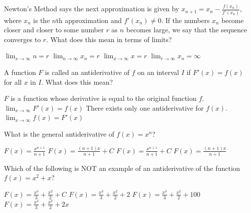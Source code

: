 \documentclass[addpoints, 12pt]{exam}%
\newcommand{\spc}{\vspace*{0.5cm}}
\begin{document}
\begin{questions}
\question[1]

Newton's Method says the next approximation is given by $x_{n+1} = x_n - \frac{f(x_n)}{f'(x_n)}$, where $x_n$ is the $n$th approximation and $f'(x_n) \neq 0$. 
If the numbers $x_n$ become closer and closer to some number $r$ as $n$ becomes large, we say that the sequence converges to $r$. What does this mean in terms of limits?

\begin{multicols}{2}
\begin{choices}
\choice $\lim_{x \to \infty} n = r$
\CorrectChoice $\lim_{n \to \infty} x_n = r$ 
\choice $\lim_{x \to \infty} x = r$
\choice $\lim_{r \to \infty} x_n = \infty$
\end{choices}  
\end{multicols}


\question[1]

A function $F$ is called an antiderivative of $f$ on an interval $I$ if $F'(x) = f(x)$ for all $x$ in $I$. What does this mean?

\begin{multicols}{2}
\begin{choices}
\CorrectChoice $F$ is a function whose derivative is equal to the original function $f$.
\choice $\lim_{x \to \infty} F'(x) = f(x)$
\choice There exists only one antiderivative for $f(x)$.
\choice $\lim_{x \to \infty} f(x) = F'(x)$
\end{choices}  
\end{multicols}

\newpage

\question[1]

What is the general antiderivative of $f(x) = x^n$?

\begin{multicols}{2}
\begin{choices}
\choice $F(x) = \frac{x^{n+1}}{n+1}$
\choice $F(x) = \frac{(n+1)x}{n+1} + C$
\CorrectChoice $F(x) = \frac{x^{n+1}}{n+1} + C$
\choice $F(x) = \frac{(n+1)x}{n+1}$
\end{choices} 
\end{multicols}

\spc

\question[1]

Which of the following is NOT an example of an antiderivative of  the function $f(x) = x^2 + x$?

\begin{multicols}{2}
\begin{choices}
\choice $F(x) = \frac{x^3}{3} + \frac{x^2}{2} + C$
\choice $F(x) = \frac{x^3}{3} + \frac{x^2}{2} + 2$
\choice $F(x) = \frac{x^3}{3} + \frac{x^2}{2} + 100$
\CorrectChoice $F(x) = \frac{x^3}{3} + \frac{x^2}{2} + 2x$
\end{choices}
\end{multicols}


\end{questions}
\end{document}
